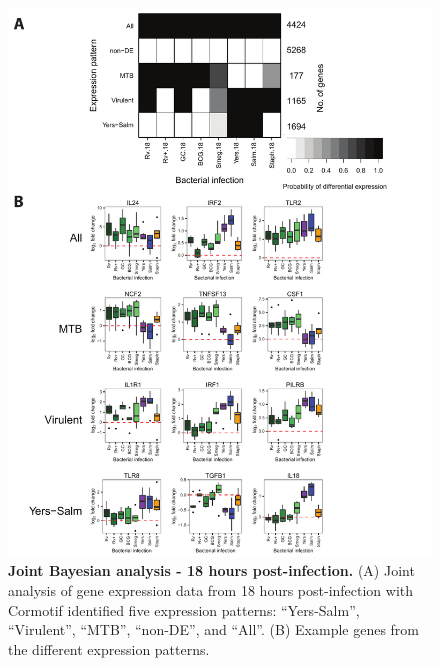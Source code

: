 \begin{figure}
\centering \includegraphics[width=5in]{img/ch02/fig-03-joint-18h.pdf}
\caption[Joint Bayesian analysis - 18 hours
  post-infection.]{\textbf{Joint Bayesian analysis - 18 hours
    post-infection.} (A) Joint analysis of gene expression data from
  18 hours post-infection with Cormotif identified five expression
  patterns: ``Yers-Salm'', ``Virulent'', ``MTB'', ``non-DE'', and
  ``All''. (B) Example genes from the different expression patterns.}
\label{fig:joint-18h}
\end{figure}

